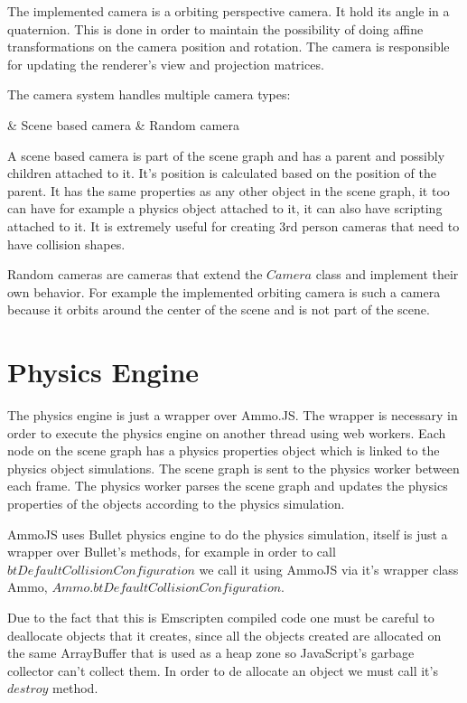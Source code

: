 The implemented camera is a orbiting perspective camera. It hold its angle in a quaternion. This is done in order to maintain the possibility of doing affine transformations on the camera position and rotation. The camera is responsible for updating the renderer’s view and projection matrices.

The camera system handles multiple camera types:
\begin{easylist}
& Scene based camera
& Random camera
\end{easylist}

A scene based camera is part of the scene graph and has a parent and possibly children attached to it. It's position is calculated based on the position of the parent. It has the same properties as any other object in the scene graph, it too can have for example a physics object attached to it, it can also have scripting attached to it. It is extremely useful for creating 3rd person cameras that need to have collision shapes.

Random cameras are cameras that extend the $Camera$ class and implement their own behavior. For example the implemented orbiting camera is such a camera because it orbits around the center of the scene and is not part of the scene. 

\section{Physics Engine}

The physics engine is just a wrapper over Ammo.JS. The wrapper is necessary in order to execute the physics engine on another thread using web workers.
Each node on the scene graph has a physics properties object which is linked to the physics object simulations. The scene graph is sent to the physics worker between each frame. The physics worker parses the scene graph and updates the physics properties of the objects according to the physics simulation.

AmmoJS uses Bullet physics engine to do the physics simulation, itself is just a wrapper over Bullet's methods, for example in order to call $btDefaultCollisionConfiguration$ we call it using AmmoJS via it's wrapper class Ammo, $Ammo.btDefaultCollisionConfiguration$.

Due to the fact that this is Emscripten compiled code one must be careful to deallocate objects that it creates, since all the objects created are allocated on the same ArrayBuffer that is used as a heap zone so JavaScript's garbage collector can't collect them. In order to de allocate an object we must call it's $destroy$ method.
